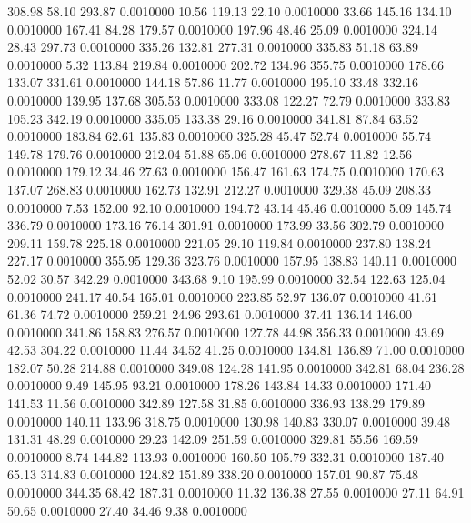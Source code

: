 308.98   58.10  293.87   0.0010000
  10.56  119.13   22.10   0.0010000
  33.66  145.16  134.10   0.0010000
 167.41   84.28  179.57   0.0010000
 197.96   48.46   25.09   0.0010000
 324.14   28.43  297.73   0.0010000
 335.26  132.81  277.31   0.0010000
 335.83   51.18   63.89   0.0010000
   5.32  113.84  219.84   0.0010000
 202.72  134.96  355.75   0.0010000
 178.66  133.07  331.61   0.0010000
 144.18   57.86   11.77   0.0010000
 195.10   33.48  332.16   0.0010000
 139.95  137.68  305.53   0.0010000
 333.08  122.27   72.79   0.0010000
 333.83  105.23  342.19   0.0010000
 335.05  133.38   29.16   0.0010000
 341.81   87.84   63.52   0.0010000
 183.84   62.61  135.83   0.0010000
 325.28   45.47   52.74   0.0010000
  55.74  149.78  179.76   0.0010000
 212.04   51.88   65.06   0.0010000
 278.67   11.82   12.56   0.0010000
 179.12   34.46   27.63   0.0010000
 156.47  161.63  174.75   0.0010000
 170.63  137.07  268.83   0.0010000
 162.73  132.91  212.27   0.0010000
 329.38   45.09  208.33   0.0010000
   7.53  152.00   92.10   0.0010000
 194.72   43.14   45.46   0.0010000
   5.09  145.74  336.79   0.0010000
 173.16   76.14  301.91   0.0010000
 173.99   33.56  302.79   0.0010000
 209.11  159.78  225.18   0.0010000
 221.05   29.10  119.84   0.0010000
 237.80  138.24  227.17   0.0010000
 355.95  129.36  323.76   0.0010000
 157.95  138.83  140.11   0.0010000
  52.02   30.57  342.29   0.0010000
 343.68    9.10  195.99   0.0010000
  32.54  122.63  125.04   0.0010000
 241.17   40.54  165.01   0.0010000
 223.85   52.97  136.07   0.0010000
  41.61   61.36   74.72   0.0010000
 259.21   24.96  293.61   0.0010000
  37.41  136.14  146.00   0.0010000
 341.86  158.83  276.57   0.0010000
 127.78   44.98  356.33   0.0010000
  43.69   42.53  304.22   0.0010000
  11.44   34.52   41.25   0.0010000
 134.81  136.89   71.00   0.0010000
 182.07   50.28  214.88   0.0010000
 349.08  124.28  141.95   0.0010000
 342.81   68.04  236.28   0.0010000
   9.49  145.95   93.21   0.0010000
 178.26  143.84   14.33   0.0010000
 171.40  141.53   11.56   0.0010000
 342.89  127.58   31.85   0.0010000
 336.93  138.29  179.89   0.0010000
 140.11  133.96  318.75   0.0010000
 130.98  140.83  330.07   0.0010000
  39.48  131.31   48.29   0.0010000
  29.23  142.09  251.59   0.0010000
 329.81   55.56  169.59   0.0010000
   8.74  144.82  113.93   0.0010000
 160.50  105.79  332.31   0.0010000
 187.40   65.13  314.83   0.0010000
 124.82  151.89  338.20   0.0010000
 157.01   90.87   75.48   0.0010000
 344.35   68.42  187.31   0.0010000
  11.32  136.38   27.55   0.0010000
  27.11   64.91   50.65   0.0010000
  27.40   34.46    9.38   0.0010000
